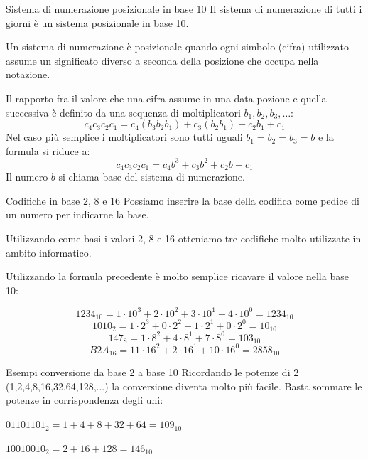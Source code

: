\documentclass[9pt, format=169, handout]{beamer}
\begin{document}
\begin{frame}{Sistema di numerazione posizionale in base 10}
Il sistema di numerazione di tutti i giorni è un sistema \alert{posizionale} in \alert{base 10}.

Un sistema di numerazione è \alert{posizionale} quando ogni simbolo (cifra) utilizzato assume un significato diverso a seconda della posizione che occupa nella notazione.

Il rapporto fra il valore che una cifra assume in una data pozione e quella successiva è definito da una sequenza di moltiplicatori $b_1, b_2, b_3, \dots$:
\[c_4c_3c_2c_1 = c_4(b_3b_2b_1) + c_3(b_2b_1) + c_2b_1 + c_1\]
\pause
Nel caso più semplice i moltiplicatori sono tutti uguali $b_1 = b_2 = b_3 = b$ e la formula si riduce a:
\[c_4c_3c_2c_1 = c_4b^3 + c_3b^2 + c_2b + c_1\]
Il numero $b$ si chiama \alert{base} del sistema di numerazione.
\end{frame}

\begin{frame}{Codifiche in base 2, 8 e 16}
Possiamo inserire la base della codifica come pedice di un numero per indicarne la base.

Utilizzando come basi i valori 2, 8 e 16 otteniamo tre codifiche molto utilizzate in ambito informatico.

Utilizzando la formula precedente è molto semplice ricavare il valore nella base 10:

\[1234_{10} = 1\cdot10^3 + 2\cdot10^2 + 3\cdot10^1 + 4\cdot10^0 = 1234_{10}\]
\pause
\[1010_{2}  = 1\cdot2^3  + 0\cdot2^2  + 1\cdot2^1  + 0\cdot2^0 = 10_{10}\]
\pause
\[147_8 = 1\cdot8^2 + 4\cdot8^1 + 7\cdot8^0 = 103_{10}\]
\pause
\[B2A_{16} = 11\cdot16^2 + 2\cdot16^1 + 10\cdot16^0 = 2858_{10}\]
\end{frame}

\begin{frame}{Esempi conversione da base 2 a base 10}
Ricordando le potenze di 2 (1,2,4,8,16,32,64,128,...) la conversione diventa molto più facile. Basta sommare le potenze in corrispondenza degli uni:

$01101101_2 = 1+4+8+32+64 = 109_{10}$

$10010010_2 = 2+16+128 = 146_{10}$
\end{frame}
\end{document}
